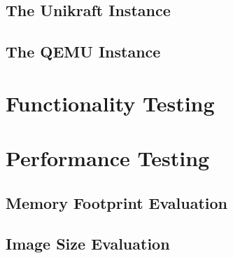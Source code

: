 \subsection{The Unikraft Instance}
\label{subsec:testing-environment-setup}

\subsection{The QEMU Instance}
\label{subsec:qemu-instance}


\section{Functionality Testing}
\label{sec:functionality-testing}


\section{Performance Testing}
\label{sec:performance-testing}

\subsection{Memory Footprint Evaluation}
\label{subsec:memory-footprint-evaluation}

\subsection{Image Size Evaluation}
\label{subsec:image-size-evaluation}

